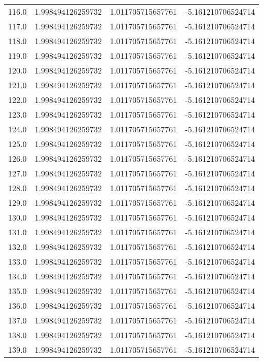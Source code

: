 \begin{longtable}{lrrr}
116.0 & 1.998494126259732 & 1.011705715657761 & -5.161210706524714 \\
117.0 & 1.998494126259732 & 1.011705715657761 & -5.161210706524714 \\
118.0 & 1.998494126259732 & 1.011705715657761 & -5.161210706524714 \\
119.0 & 1.998494126259732 & 1.011705715657761 & -5.161210706524714 \\
120.0 & 1.998494126259732 & 1.011705715657761 & -5.161210706524714 \\
121.0 & 1.998494126259732 & 1.011705715657761 & -5.161210706524714 \\
122.0 & 1.998494126259732 & 1.011705715657761 & -5.161210706524714 \\
123.0 & 1.998494126259732 & 1.011705715657761 & -5.161210706524714 \\
124.0 & 1.998494126259732 & 1.011705715657761 & -5.161210706524714 \\
125.0 & 1.998494126259732 & 1.011705715657761 & -5.161210706524714 \\
126.0 & 1.998494126259732 & 1.011705715657761 & -5.161210706524714 \\
127.0 & 1.998494126259732 & 1.011705715657761 & -5.161210706524714 \\
128.0 & 1.998494126259732 & 1.011705715657761 & -5.161210706524714 \\
129.0 & 1.998494126259732 & 1.011705715657761 & -5.161210706524714 \\
130.0 & 1.998494126259732 & 1.011705715657761 & -5.161210706524714 \\
131.0 & 1.998494126259732 & 1.011705715657761 & -5.161210706524714 \\
132.0 & 1.998494126259732 & 1.011705715657761 & -5.161210706524714 \\
133.0 & 1.998494126259732 & 1.011705715657761 & -5.161210706524714 \\
134.0 & 1.998494126259732 & 1.011705715657761 & -5.161210706524714 \\
135.0 & 1.998494126259732 & 1.011705715657761 & -5.161210706524714 \\
136.0 & 1.998494126259732 & 1.011705715657761 & -5.161210706524714 \\
137.0 & 1.998494126259732 & 1.011705715657761 & -5.161210706524714 \\
138.0 & 1.998494126259732 & 1.011705715657761 & -5.161210706524714 \\
139.0 & 1.998494126259732 & 1.011705715657761 & -5.161210706524714 \\

\end{longtable}

